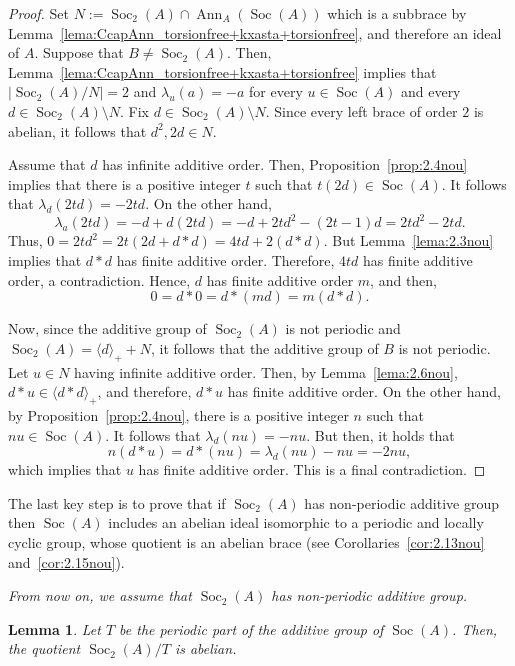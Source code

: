 \documentclass[12pt, a4paper, english]{article}
\newtheorem{lema}[teorema]{Lemma}
\theoremstyle{definition}
\DeclareMathOperator{\Ann}{Ann}
\DeclareMathOperator{\Soc}{Soc}
\begin{document}
\begin{proof}
Set $N := \Soc_2(A) \cap \Ann_A(\Soc(A))$ which is a subbrace by Lemma~\ref{lema:CcapAnn_torsionfree+kxasta+torsionfree}, and therefore an ideal of $A$. Suppose that $B\neq \Soc_2(A)$. Then, Lemma~\ref{lema:CcapAnn_torsionfree+kxasta+torsionfree} implies that $|\Soc_2(A)/N| = 2$ and $\lambda_u(a)= -a$ for every $u \in \Soc(A)$ and every $d\in \Soc_2(A)\setminus N$. Fix $d\in \Soc_2(A)\setminus N$. Since every left brace of order $2$ is abelian, it follows that $d^2, 2d\in N$. 

Assume that $d$ has infinite additive order. Then, Proposition~\ref{prop:2.4nou} implies that there is a positive integer $t$ such that $t(2d) \in \Soc(A)$. It follows that $\lambda_d(2td) = -2td$. On the other hand,
\[ \lambda_a(2td) = -d + d(2td) = -d + 2td^2 - (2t -1)d  = 2td^2 - 2td.\]
Thus, $0 = 2td^2 = 2t(2d + d\ast d) = 4td + 2(d\ast d)$. But Lemma~\ref{lema:2.3nou} implies that $d \ast d$ has finite additive order. Therefore, $4td$ has finite additive order, a contradiction. Hence, $d$ has finite additive order $m$, and then, 
\[ 0 = d \ast 0 = d \ast (md) = m(d \ast d).\]

Now, since the additive group of $\Soc_2(A)$ is not periodic and $\Soc_2(A) = \langle d \rangle_+ + N$, it follows that the additive group of $B$ is not periodic. Let $u\in N$ having infinite additive order. Then, by Lemma~\ref{lema:2.6nou}, $d \ast u \in \langle d \ast d\rangle_+$, and therefore, $d \ast u$ has finite additive order. On the other hand, by Proposition~\ref{prop:2.4nou}, there is a positive integer $n$ such that $nu \in \Soc(A)$. It follows that $\lambda_d(nu) = -nu$. But then, it holds that
\[ n(d\ast u) = d \ast (nu) = \lambda_d(nu) - nu = -2nu,\]
which implies that $u$ has finite additive order. This is a final contradiction.
\end{proof}


The last key step is to prove that if $\Soc_2(A)$ has non-periodic additive group then $\Soc(A)$ includes an abelian ideal isomorphic to a periodic and locally cyclic group, whose quotient is an abelian brace (see Corollaries~\ref{cor:2.13nou} and~\ref{cor:2.15nou}).

\emph{From now on, we assume that $\Soc_2(A)$ has non-periodic additive group.}

\begin{lema}
\label{lema:2.7nou}
Let $T$ be the periodic part of the additive group of $\Soc(A)$. Then, the quotient $\Soc_2(A)/T$ is abelian.
\end{lema}
\end{document}
